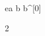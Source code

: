 \begin{eqcode}{e}{a }{}{}
  b \in {} \lend   
  b^{[0]} \gets \begin{tmatrix} 2  \lend \end{tmatrix} \lend   %
   \lend
\end{eqcode}
